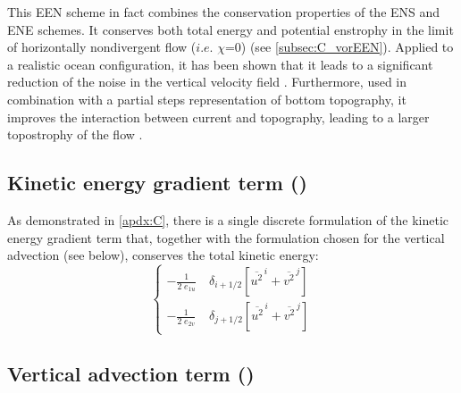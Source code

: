 \documentclass[../tex_main/NEMO_manual]{subfiles}
\begin{document}
This EEN scheme in fact combines the conservation properties of the ENS and ENE schemes.
It conserves both total energy and potential enstrophy in the limit of horizontally nondivergent flow
($i.e.$ $\chi$=$0$) (see \autoref{subsec:C_vorEEN}). 
Applied to a realistic ocean configuration, it has been shown that it leads to a significant reduction of
the noise in the vertical velocity field \citep{Le_Sommer_al_OM09}.
Furthermore, used in combination with a partial steps representation of bottom topography,
it improves the interaction between current and topography,
leading to a larger topostrophy of the flow \citep{Barnier_al_OD06, Penduff_al_OS07}. 

\subsection{Kinetic energy gradient term (\protect{})}
\label{subsec:DYN_keg}

As demonstrated in \autoref{apdx:C},
there is a single discrete formulation of the kinetic energy gradient term that,
together with the formulation chosen for the vertical advection (see below),
conserves the total kinetic energy:
\begin{equation} \label{eq:dynkeg}
\left\{ \begin{aligned}
 -\frac{1}{2 \; e_{1u} }  & \ \delta _{i+1/2} \left[ {\overline {u^2}^{\,i} + \overline{v^2}^{\,j}} \right]   \\
 -\frac{1}{2 \; e_{2v} }  & \ \delta _{j+1/2} \left[ {\overline {u^2}^{\,i} + \overline{v^2}^{\,j}} \right]    
\end{aligned} \right.
\end{equation} 

\subsection{Vertical advection term (\protect{}) }
\label{subsec:DYN_zad}
\end{document}
